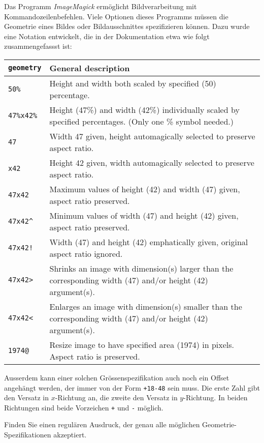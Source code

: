 Das Programm {\em ImageMagick} ermöglicht Bildverarbeitung mit
Kommandozeilenbefehlen. Viele Optionen dieses Programms müssen die
Geometrie eines Bildes oder Bildausschnittes spezifizieren können.
Dazu wurde eine Notation entwickelt, die in der Dokumentation etwa
wie folgt zusammengefassst ist:
\begin{center}
\begin{tabular}{>{\tt}lp{5.75in}}
\rm geometry&General description\\
\hline
50\%&Height and width both scaled by specified (50) percentage.\\
47\%x42\%&Height (47\%) and width (42\%) individually scaled by specified
percentages. (Only one \% symbol needed.)\\
47&Width 47 given, height automagically selected to preserve aspect ratio.\\
x42&Height 42 given, width automagically selected to preserve aspect ratio.\\
47x42&Maximum values of height (42) and width (47) given, aspect ratio
preserved.\\
47x42\^&Minimum values of width (47) and height (42) given, aspect ratio
preserved.\\
47x42!&Width (47) and height (42) emphatically given, original
aspect ratio ignored.\\
47x42>&Shrinks an image with dimension(s) larger than the
corresponding width (47) and/or height (42) argument(s).\\
47x42<&Enlarges an image with dimension(s) smaller than the
corresponding width (47) and/or height (42) argument(s).\\
1974@&Resize image to have specified area (1974) in pixels. Aspect ratio is
preserved.\\
\hline
\end{tabular}
\end{center}
Ausserdem kann einer solchen Grössenspezifikation auch noch ein Offset
angehängt werden, der immer von der Form
\texttt{+18-48}
sein muss. Die erste Zahl gibt den Versatz in $x$-Richtung an, die zweite
den Versatz in $y$-Richtung. In beiden Richtungen sind beide Vorzeichen 
\texttt{+} und \texttt{-} möglich.

Finden Sie einen regulären Ausdruck, der genau alle möglichen
Geometrie-Spezifikationen akzeptiert.

